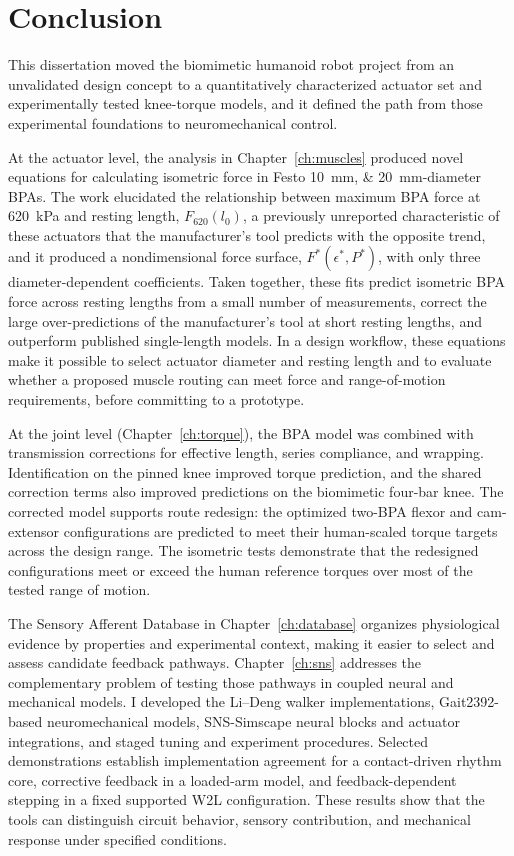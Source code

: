 \chapter{Conclusion}\label{ch:conclusion}
\graphicspath{{../Figures/80-conclusion/}{figs/80-conclusion/}}

This dissertation moved the biomimetic humanoid robot project from an unvalidated design concept to a quantitatively characterized actuator set and experimentally tested knee-torque models, and it defined the path from those experimental foundations to neuromechanical control.

At the actuator level, the analysis in Chapter~\ref{ch:muscles} produced novel equations for calculating isometric force in Festo \qtylist{10;20}{\mm}-diameter BPAs. The work elucidated the relationship between maximum BPA force at \qty{620}{\kPa} and resting length, $F_{620}(l_0)$, a previously unreported characteristic of these actuators that the manufacturer's tool predicts with the opposite trend, and it produced a nondimensional force surface, $F^*(\epsilon^*,P^*)$, with only three diameter-dependent coefficients. Taken together, these fits predict isometric BPA force across resting lengths from a small number of measurements, correct the large over-predictions of the manufacturer's tool at short resting lengths, and outperform published single-length models. In a design workflow, these equations make it possible to select actuator diameter and resting length and to evaluate whether a proposed muscle routing can meet force and range-of-motion requirements, before committing to a prototype.

At the joint level (Chapter~\ref{ch:torque}), the BPA model was combined with transmission corrections for effective length, series compliance, and wrapping. Identification on the pinned knee improved torque prediction, and the shared correction terms also improved predictions on the biomimetic four-bar knee. The corrected model supports route redesign: the optimized two-BPA flexor and cam-extensor configurations are predicted to meet their human-scaled torque targets across the design range. The isometric tests demonstrate that the redesigned configurations meet or exceed the human reference torques over most of the tested range of motion.

The Sensory Afferent Database in Chapter~\ref{ch:database} organizes physiological evidence by properties and experimental context, making it easier to select and assess candidate feedback pathways. Chapter~\ref{ch:sns} addresses the complementary problem of testing those pathways in coupled neural and mechanical models. I developed the Li--Deng walker implementations, Gait2392-based neuromechanical models, SNS-Simscape neural blocks and actuator integrations, and staged tuning and experiment procedures. Selected demonstrations establish implementation agreement for a contact-driven rhythm core, corrective feedback in a loaded-arm model, and feedback-dependent stepping in a fixed supported W2L configuration. These results show that the tools can distinguish circuit behavior, sensory contribution, and mechanical response under specified conditions.

